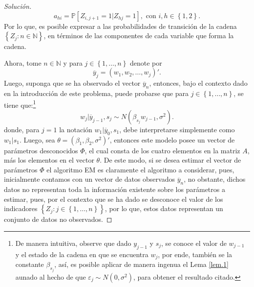 \documentclass[10.5pt,notitlepage]{article}
\newenvironment{solucion}
  {\begin{proof}[Solución]}
  {\end{proof}}
\newcommand{\PP}{\mathbb{P}}
\newcommand{\ee}{\varepsilon}
\newcommand{\NN}{\mathbb{N}}
\newcommand{\kis}[1]{\left\{ #1 \right\}}
\theoremstyle{plain}
\begin{document}
\begin{solucion}
\begin{equation}\label{lab.4}
a_{hi} = \PP[Z_{i,j + 1} = 1| Z_{hj} = 1], \text{ con } i, h \in \kis{1,2}.    
\end{equation}
Por lo que, es posible expresar a las probabilidades de transición de la cadena \(\kis{Z_{j}: n \in \NN}\), en términos de las componentes de cada variable que forma la cadena.

Ahora, tome \(n \in \NN\) y para \(j \in \kis{1, \hdots, n}\) denote por 
\[
\overline{y}_{j} = (w_1 , w_2, \hdots, w_{j})'.
\]
Luego, suponga que se ha observado el vector \(\overline{y}_{n}\), entonces, bajo el contexto dado en la introducción de este problema, puede probarse que para \(j \in \kis{1, \hdots, n}\), se tiene que:\footnote{De manera intuitiva, observe que dado \(y_{j-1}\) y \(s_{j}\), se conoce el valor de \(w_{j-1}\) y el estado de la cadena en que se encuentra \(w_{j}\), por ende, también se la constante \(\beta_{s_{j}}\), así, es posible aplicar de manera ingenua el Lema \ref{lem.1} aunado al hecho de que \(\ee_j \sim N(0, \sigma^2)\), para obtener el resultado citado.}
\begin{equation}\label{lab.6}
    w_j |\overline{y}_{j-1},s_{j} \sim N(\beta_{s_{j}} w_{j-1},\sigma^2).
\end{equation}
donde, para \(j = 1\) la notación \(w_{1}| \overline{y}_{0}, s_{1}\), debe interpretarse simplemente como \(w_{1}| s_{1}\). Luego, sea \(\theta = (\beta_1, \beta_2, \sigma^2)'\), entonces este modelo posee un vector de parámetros desconocidos \(\Phi\), el cual consta de los cuatro elementos en la matriz \(A\), más los elementos en el vector \(\theta\). De este modo, si se desea estimar el vector de parámetros \(\Phi\) el algoritmo EM es claramente el algoritmo a considerar, pues, inicialmente contamos con un vector de datos observados \(\overline{y}_n\), no obstante, dichos datos no representan toda la información existente sobre los parámetros a estimar, pues, por el contexto que se ha dado se desconoce el valor de los indicadores \(\kis{Z_{j}:j\in \kis{1, \hdots,n}}\), por lo que, estos datos representan un conjunto de datos no observados. 


\end{solucion}
\end{document}
